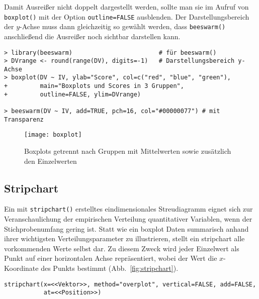 Damit Ausreißer nicht doppelt dargestellt werden, sollte man sie im Aufruf von \lstinline!boxplot()! mit der Option \lstinline!outline=FALSE! ausblenden. Der Darstellungsbereich der $y$-Achse muss dann gleichzeitig so gewählt werden, dass \lstinline!beeswarm()! anschließend die Ausreißer noch sichtbar darstellen kann.
\begin{lstlisting}
> library(beeswarm)                        # für beeswarm()
> DVrange <- round(range(DV), digits=-1)   # Darstellungsbereich y-Achse
> boxplot(DV ~ IV, ylab="Score", col=c("red", "blue", "green"),
+         main="Boxplots und Scores in 3 Gruppen",
+         outline=FALSE, ylim=DVrange)
 
> beeswarm(DV ~ IV, add=TRUE, pch=16, col="#00000077") # mit Transparenz
\end{lstlisting}

\begin{figure}[ht]
\centering
\texttt{[image: boxplot]}
\vspace*{-1em}
\caption{Boxplots getrennt nach Gruppen mit Mittelwerten sowie zusätzlich den Einzelwerten}
\label{fig:boxplot}
\end{figure}

\subsection{Stripchart}

Ein mit \lstinline!stripchart()! erstelltes eindimensionales Streudiagramm eignet sich zur Veranschaulichung der empirischen Verteilung quantitativer Variablen, wenn der Stichprobenumfang gering ist. Statt wie ein boxplot Daten summarisch anhand ihrer wichtigsten Verteilungsparameter zu illustrieren, stellt ein stripchart alle vorkommenden Werte selbst dar. Zu diesem Zweck wird jeder Einzelwert als Punkt auf einer horizontalen Achse repräsentiert, wobei der Wert die $x$-Koordinate des Punkts bestimmt (Abb.\ \ref{fig:stripchart}).
\begin{lstlisting}
stripchart(x=<<Vektor>>, method="overplot", vertical=FALSE, add=FALSE,
           at=<<Position>>)
\end{lstlisting}

